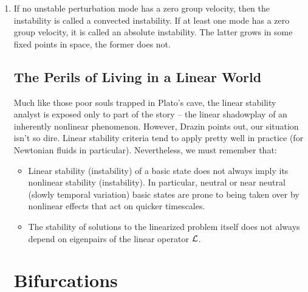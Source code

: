 \begin{enumerate}
    \item If no unstable perturbation mode has a zero group velocity, then the instability is called a convected instability. If at least one mode has a zero group velocity, it is called an absolute instability. The latter grows in some fixed points in space, the former does not. 
    
    \subsection{The Perils of Living in a Linear World}
    
    Much like those poor souls trapped in Plato's cave, the linear stability analyst is exposed only to part of the story -- the linear shadowplay of an inherently nonlinear phenomenon. However, Drazin points out, our situation isn't so dire. Linear stability criteria tend to apply pretty well in practice (for Newtonian fluids in particular). Nevertheless, we must remember that: 
    \begin{itemize}
        \item Linear stability (instability) of a basic state does not always imply its nonlinear stability (instability). In particular, neutral or near neutral (slowly temporal variation) basic states are prone to being taken over by nonlinear effects that act on quicker timescales. 
        
        \item The stability of solutions to the linearized problem itself does not always depend on eigenpairs of the linear operator $\mathcal{L}$. 
    \end{itemize}
    
    \section{Bifurcations}
\end{enumerate}

